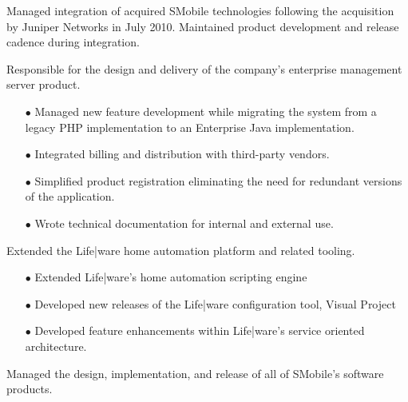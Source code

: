\documentclass[12pt,letter,roman]{moderncv}
\begin{document}
Managed integration of acquired SMobile technologies following the
acquisition by Juniper Networks in July 2010.  Maintained product
development and release cadence during integration.

\vspace{0.5em}

Responsible for the design and delivery of the company's enterprise management
server product.

\begin{itemize}

    \item[$\bullet$] Managed new feature development while migrating the system from a
        legacy PHP implementation to an Enterprise Java implementation.

    \item[$\bullet$] Integrated billing and distribution with third-party vendors.

    \item[$\bullet$] Simplified product registration eliminating the need for redundant
        versions of the application.

    \item[$\bullet$] Wrote technical documentation for internal and external use.

\end{itemize}

\vspace{0.5em}

Extended the Life|ware home automation platform and related tooling.

\begin{itemize}
    \item[$\bullet$] Extended Life|ware's home automation scripting engine
    \item[$\bullet$] Developed new releases of the Life|ware configuration tool, Visual Project
    \item[$\bullet$] Developed feature enhancements within Life|ware's service oriented architecture.
\end{itemize}

\vspace{0.5em}
 {}{}

Managed the design, implementation, and release of all of SMobile's software
products.
\end{document}
